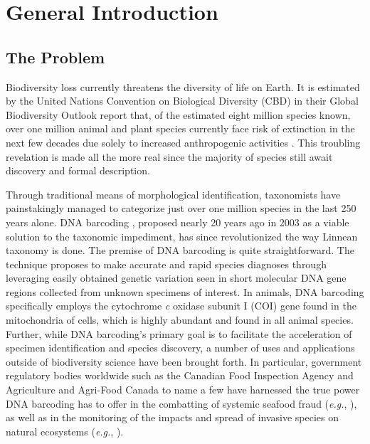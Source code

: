 \linespread{1.0}

\chapter{General Introduction}

\section{The Problem}

Biodiversity loss currently threatens the diversity of life on Earth. It is estimated by the United Nations Convention on Biological Diversity (CBD) in their Global Biodiversity Outlook report that, of the estimated eight million species known, over one million animal and plant species currently face risk of extinction in the next few decades due solely to increased anthropogenic activities \cite{cbd2020global}. This troubling revelation is made all the more real since the majority of species still await discovery and formal description. 

\vspace{5mm}

Through traditional means of morphological identification, taxonomists have \\ painstakingly managed to categorize just over one million species in the last 250 years alone. DNA barcoding \cite{hebert2003biological, hebert2003barcoding}, proposed nearly 20 years ago in 2003 as a viable solution to the taxonomic impediment, has since revolutionized the way Linnean taxonomy is done. The premise of DNA barcoding is quite straightforward. The technique proposes to make accurate and rapid species diagnoses through leveraging easily obtained genetic variation seen in short molecular DNA gene regions collected from unknown specimens of interest. In animals, DNA barcoding specifically employs the cytochrome \textit{c} oxidase subunit I (COI) gene found in the mitochondria of cells, which is highly abundant and found in all animal species. Further, while DNA barcoding's primary goal is to facilitate the acceleration of specimen identification and species discovery, a number of uses and applications outside of biodiversity science have been brought forth. In particular, government regulatory bodies worldwide such as the Canadian Food Inspection Agency and Agriculture and Agri-Food Canada to name a few have harnessed the true power DNA barcoding has to offer in the combatting of systemic seafood fraud (\textit{e.g.}, \cite{shehata2018dna, shehata2019survey}), as well as in the monitoring of the impacts and spread of invasive species on natural ecosystems (\textit{e.g.}, \cite{madden2019using}).

